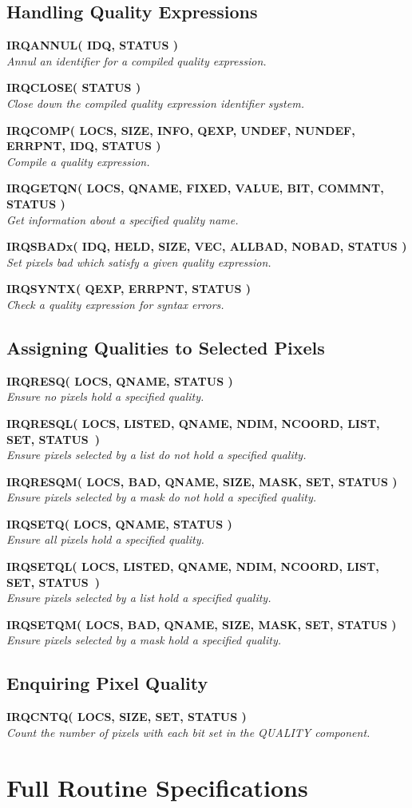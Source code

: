 \documentclass[twoside,11pt]{article}
\newcommand{\noteroutine}[2]{\textbf{#1}\hspace*{\fill}\nopagebreak \\
                             \hspace*{3em}\emph{#2}\hspace*{\fill}\par}
\newcommand{\xlabel}[1]{}
\renewcommand{\_}{\texttt{\symbol{95}}}
\begin{document}
\subsection{Handling Quality Expressions}
\noteroutine{IRQ\_ANNUL( IDQ, STATUS )}
   {Annul an identifier for a compiled quality expression.}
\noteroutine{IRQ\_CLOSE( STATUS )}
   {Close down the compiled quality expression identifier system.}
\noteroutine{IRQ\_COMP( LOCS, SIZE, INFO, QEXP, UNDEF, NUNDEF, ERRPNT, IDQ, STATUS )}
   {Compile a quality expression.}
\noteroutine{IRQ\_GETQN( LOCS, QNAME, FIXED, VALUE, BIT, COMMNT, STATUS )}
   {Get information about a specified quality name.}
\noteroutine{IRQ\_SBADx( IDQ, HELD, SIZE, VEC, ALLBAD, NOBAD, STATUS )}
   {Set pixels bad which satisfy a given quality expression.}
\noteroutine{IRQ\_SYNTX( QEXP, ERRPNT, STATUS )}
   {Check a quality expression for syntax errors.}

\subsection{Assigning Qualities to Selected Pixels}
\noteroutine{IRQ\_RESQ( LOCS, QNAME, STATUS )}
   {Ensure no pixels hold a specified quality.}
\noteroutine{IRQ\_RESQL( LOCS, LISTED, QNAME, NDIM, NCOORD, LIST, SET,
STATUS~)}
   {Ensure pixels selected by a list do not hold a specified quality.}
\noteroutine{IRQ\_RESQM( LOCS, BAD, QNAME, SIZE, MASK, SET, STATUS )}
   {Ensure pixels selected by a mask do not hold a specified quality.}
\noteroutine{IRQ\_SETQ( LOCS, QNAME, STATUS )}
   {Ensure all pixels hold a specified quality.}
\noteroutine{IRQ\_SETQL( LOCS, LISTED, QNAME, NDIM, NCOORD, LIST, SET,
STATUS~)}
   {Ensure pixels selected by a list hold a specified quality.}
\noteroutine{IRQ\_SETQM( LOCS, BAD, QNAME, SIZE, MASK, SET, STATUS )}
   {Ensure pixels selected by a mask hold a specified quality.}

\subsection{Enquiring Pixel Quality}
\noteroutine{IRQ\_CNTQ( LOCS, SIZE, SET, STATUS )}
   {Count the number of pixels with each bit set in the QUALITY component.}

\newpage
\section {\xlabel{SEC:FULLSPEC}Full Routine Specifications}
\label {SEC:FULLSPEC}
\end{document}
